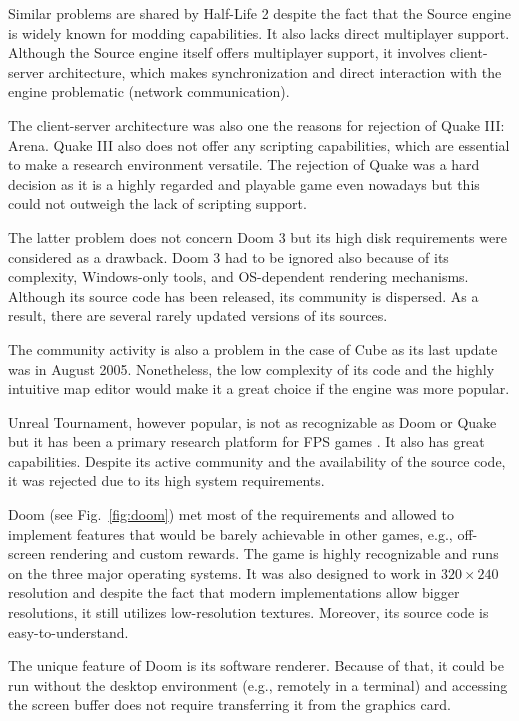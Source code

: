 \documentclass[english,american,conference, balance]{IEEEtran}
\begin{document}
Similar problems are shared by Half-Life 2 despite the fact that the
Source engine is widely known for modding capabilities. It also lacks
direct multiplayer support. Although the Source engine itself offers
multiplayer support, it involves client-server architecture, which
makes synchronization and direct interaction with the engine problematic
(network communication).

The client-server
architecture was also one the reasons for rejection of Quake III:
Arena. Quake III also does not offer any scripting capabilities, which
are essential to make a research environment versatile. The rejection
of Quake was a hard decision as it is a highly regarded and playable
game even nowadays but this could not outweigh the lack of scripting
support.

The latter problem does not concern Doom 3 but its high disk requirements
were considered as a drawback. Doom 3 had to be ignored also because
of its complexity, Windows-only tools, and OS-dependent rendering
mechanisms. Although its source code has been released, its community
is dispersed. As a result, there are several rarely updated versions
of its sources.

The community activity is also a problem in the case of Cube as its
last update was in August 2005. Nonetheless, the low complexity of
its code and the highly intuitive map editor would make it a great
choice if the engine was more popular.

Unreal Tournament, however popular, is not as recognizable as Doom
or Quake but it has been a primary research platform for FPS games
\cite{5586059,6046867}. It also has great capabilities. Despite its
active community and the availability of the source code, it was rejected
due to its high system requirements.

Doom (see Fig.~\ref{fig:doom}) met most of the requirements and
allowed to implement features that would be barely achievable in other
games, e.g., off-screen rendering and custom rewards. The game is
highly recognizable and runs on the three major operating systems.
It was also designed to work in $320\times240$ resolution and despite
the fact that modern implementations allow bigger resolutions, it
still utilizes low-resolution textures. Moreover, its source code
is easy-to-understand.

The unique feature of Doom is its software renderer. Because of that,
it could be run without the desktop environment (e.g., remotely in
a terminal) and accessing the screen buffer does not require transferring
it from the graphics card.
\end{document}
